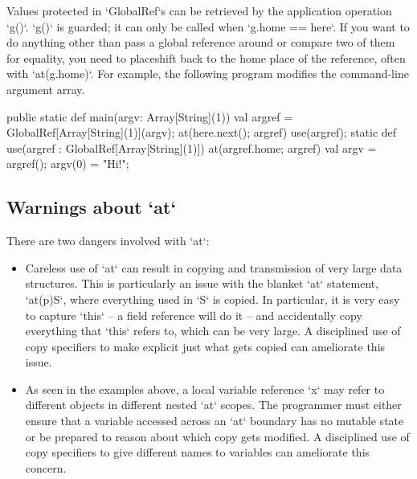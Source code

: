 Values protected in \xcd`GlobalRef`s can be retrieved by the application
operation \xcd`g()`.  \xcd`g()` is guarded; it can 
only be called when \xcd`g.home == here`.  If you  want to do anything other
than pass a global reference around or compare two of them for equality, you
need to placeshift back to the home place of the reference, often with
\xcd`at(g.home)`.   For example, the following  program modifies the
command-line argument array.

\begin{xten}
  public static def main(argv: Array[String](1)) {
    val argref = GlobalRef[Array[String](1)](argv);
    at(here.next(); argref) 
        use(argref);
  }
  static def use(argref : GlobalRef[Array[String](1)]) {
    at(argref.home; argref) {
      val argv = argref();
      argv(0) = "Hi!";
    }
  }
\end{xten}





\subsection{Warnings about \xcd`at`}
There are two dangers involved with \xcd`at`: 
\begin{itemize}
\item Careless use of \xcd`at` can result in copying and transmission
of very large data structures.  This is particularly an issue with the blanket
\xcd`at` statement, \xcd`at(p)S`, where everything used in \xcd`S` is copied.  
In particular, it is very easy to capture
\xcd`this` -- a field reference will do it -- and accidentally copy everything
that \xcd`this` refers to, which can be very large.  A disciplined use of copy
specifiers to make explicit just what gets copied can ameliorate this issue.

\item As seen in the examples above, a local variable reference
  \xcd`x` may refer to different objects in different nested \xcd`at`
  scopes. The programmer must either ensure that a variable accessed
  across an \xcd`at` boundary has no mutable state or be prepared to
  reason about which copy gets modified.   A disciplined use of copy specifiers to give
  different names to variables can ameliorate this concern.
\end{itemize}


